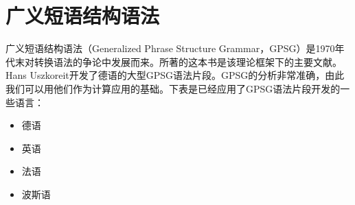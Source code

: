 
\chapter{广义短语结构语法}
\label{Kapitel-GPSG}

广义短语结构语法（Generalized Phrase Structure Grammar，GPSG）是1970年代末对转换语法的争论中发展而来。\citet*{GKPS85a}所著的这本书是该理论框架下的主要文献。Hans Uszkoreit开发了德语的大型GPSG语法片段\citeyearpar{Uszkoreit87a}。GPSG的分析非常准确，由此我们可以用他们作为计算应用的基础。下表是已经应用了GPSG语法片段开发的一些语言：
\begin{itemize}
\item 德语 \citep{Weisweber87a-u,WP92b,Naumann87a-u,Naumann88-u-gekauft,Volk88}
\item 英语 \citep*{Evans85a-u,PT85a-u,Phillips92a-u,GCB93a-u}
\item 法语 \citep*{EdSB96a}
\item 波斯语 \citep*{BSM2011a}
\end{itemize}


